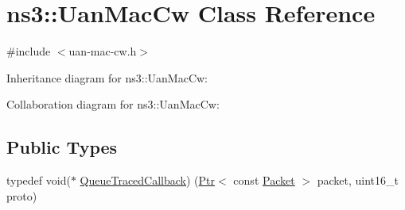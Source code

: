 \hypertarget{classns3_1_1UanMacCw}{}\section{ns3\+:\+:Uan\+Mac\+Cw Class Reference}
\label{classns3_1_1UanMacCw}


{\ttfamily \#include $<$uan-\/mac-\/cw.\+h$>$}



Inheritance diagram for ns3\+:\+:Uan\+Mac\+Cw\+:


Collaboration diagram for ns3\+:\+:Uan\+Mac\+Cw\+:
\subsection*{Public Types}
\begin{DoxyCompactItemize}
\item 
typedef void($\ast$ \hyperlink{classns3_1_1UanMacCw_af867de531528232f3c3b7fcbe10f9416}{Queue\+Traced\+Callback}) (\hyperlink{classns3_1_1Ptr}{Ptr}$<$ const \hyperlink{classns3_1_1Packet}{Packet} $>$ packet, uint16\+\_\+t proto)
\end{DoxyCompactItemize}
